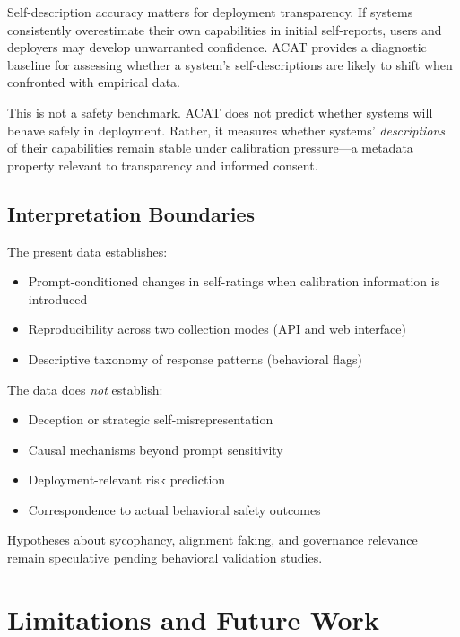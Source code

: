 \documentclass[11pt,a4paper]{article}
\begin{document}
Self-description accuracy matters for deployment transparency. If systems consistently overestimate their own capabilities in initial self-reports, users and deployers may develop unwarranted confidence. ACAT provides a diagnostic baseline for assessing whether a system's self-descriptions are likely to shift when confronted with empirical data.

This is not a safety benchmark. ACAT does not predict whether systems will behave safely in deployment. Rather, it measures whether systems' \textit{descriptions} of their capabilities remain stable under calibration pressure---a metadata property relevant to transparency and informed consent.

\subsection{Interpretation Boundaries}

The present data establishes:
\begin{itemize}
\item Prompt-conditioned changes in self-ratings when calibration information is introduced
\item Reproducibility across two collection modes (API and web interface)
\item Descriptive taxonomy of response patterns (behavioral flags)
\end{itemize}

The data does \textit{not} establish:
\begin{itemize}
\item Deception or strategic self-misrepresentation
\item Causal mechanisms beyond prompt sensitivity
\item Deployment-relevant risk prediction
\item Correspondence to actual behavioral safety outcomes
\end{itemize}

Hypotheses about sycophancy, alignment faking, and governance relevance remain speculative pending behavioral validation studies.

\section{Limitations and Future Work}
\end{document}
